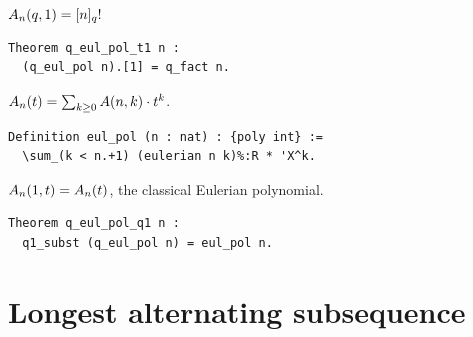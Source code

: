 \begin{theorem}[Specialize $t := 1$]
  $A_n(q, 1) = [n]_q!$
\end{theorem}

\begin{lstlisting}[language=Rocq]
Theorem q_eul_pol_t1 n :
  (q_eul_pol n).[1] = q_fact n.
\end{lstlisting}


\begin{definition}
  $A_n(t) = \sum_{k \geq 0} A(n, k) \cdot t^k$.
\end{definition}

\begin{lstlisting}[language=Rocq]
Definition eul_pol (n : nat) : {poly int} :=
  \sum_(k < n.+1) (eulerian n k)%:R * 'X^k.
\end{lstlisting}


\begin{theorem}[Specialize $q := 1$]
  $A_n(1, t) = A_n(t)$, the classical Eulerian
  polynomial.
\end{theorem}

\begin{lstlisting}[language=Rocq]
Theorem q_eul_pol_q1 n :
  q1_subst (q_eul_pol n) = eul_pol n.
\end{lstlisting}


\clearpage

\chapter{Longest alternating subsequence}
\label{ch:altsub}

